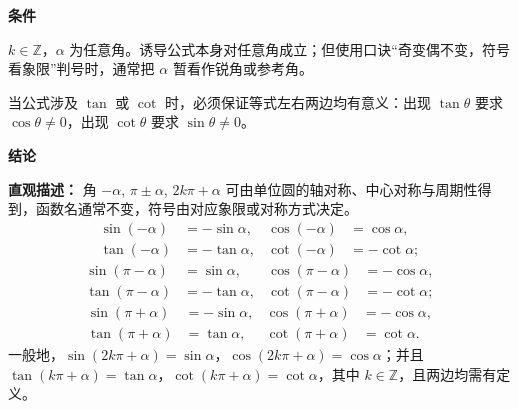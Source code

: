 \begin{statementbox}

\textbf{\textcolor{CStatement}{条件}}
\begin{description}[style=nextline, leftmargin=2.8em, labelsep=0.5em, itemsep=0.35em]
\item[\textbf{\textcolor{CStatement}{条件 1（整数与角）：}}] $k\in\mathbb{Z}$，$\alpha$ 为任意角。诱导公式本身对任意角成立；但使用口诀“奇变偶不变，符号看象限”判号时，通常把 $\alpha$ 暂看作锐角或参考角。
\item[\textbf{\textcolor{CStatement}{条件 2（定义域）：}}] 当公式涉及 $\tan$ 或 $\cot$ 时，必须保证等式左右两边均有意义：出现 $\tan\theta$ 要求 $\cos\theta\neq0$，出现 $\cot\theta$ 要求 $\sin\theta\neq0$。
\end{description}

\textbf{\textcolor{CStatement}{结论}}
\begin{description}[style=nextline, leftmargin=2.8em, labelsep=0.5em, itemsep=0.45em]
\item[\textbf{\textcolor{CStatement}{结论一（对称与周期公式）：}}]
\textbf{\textcolor{CStatement}{直观描述：}} 角 $-\alpha$, $\pi\pm\alpha$, $2k\pi+\alpha$ 可由单位圆的轴对称、中心对称与周期性得到，函数名通常不变，符号由对应象限或对称方式决定。
\[
\begin{aligned}
\sin(-\alpha)&=-\sin\alpha, & \cos(-\alpha)&=\cos\alpha,\\
\tan(-\alpha)&=-\tan\alpha, & \cot(-\alpha)&=-\cot\alpha;
\end{aligned}
\]
\[
\begin{aligned}
\sin(\pi-\alpha)&=\sin\alpha, & \cos(\pi-\alpha)&=-\cos\alpha,\\
\tan(\pi-\alpha)&=-\tan\alpha, & \cot(\pi-\alpha)&=-\cot\alpha;
\end{aligned}
\]
\[
\begin{aligned}
\sin(\pi+\alpha)&=-\sin\alpha, & \cos(\pi+\alpha)&=-\cos\alpha,\\
\tan(\pi+\alpha)&=\tan\alpha, & \cot(\pi+\alpha)&=\cot\alpha.
\end{aligned}
\]
一般地，$\sin(2k\pi+\alpha)=\sin\alpha$，$\cos(2k\pi+\alpha)=\cos\alpha$；并且 $\tan(k\pi+\alpha)=\tan\alpha$，$\cot(k\pi+\alpha)=\cot\alpha$，其中 $k\in\mathbb{Z}$，且两边均需有定义。


\end{description}
\end{statementbox}

